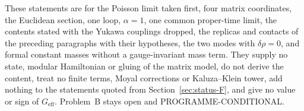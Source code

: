 These statements are for the Poisson limit taken first, four matrix coordinates, the Euclidean section, one loop, \(\alpha=1\), one common proper-time limit, the contents stated with the Yukawa couplings dropped, the replicas and contacts of the preceding paragraphs with their hypotheses, the two modes with \(\delta\rho=0\), and formal constant masses without a gauge-invariant mass term. They supply no state, modular Hamiltonian or gluing of the matrix model, do not derive the content, treat no finite terms, Moyal corrections or Kaluza--Klein tower, add nothing to the statements quoted from Section~\ref{sec:status-F}, and give no value or sign of \(G_{\mathrm{eff}}\). Problem~B stays open and PROGRAMME-CONDITIONAL.

